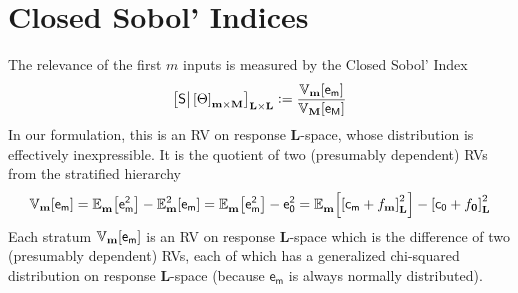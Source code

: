 \documentclass[preprint,12pt]{elsarticle}
\newcommand*{\M}[1]{\ensuremath{#1}\xspace}
\newcommand*{\x}{\times}
\newcommand*{\mi}[1]{\mathbf{#1}}
\newcommand*{\rv}[1]{\mathsf{#1}}
\newcommand*{\te}[2][]{\left\lbrack{#2}\right\rbrack_{#1}}
\newcommand*{\deq}{\M{\mathrel{\mathop:}=}}
\newcommand*{\ev}[3][]{\mathbb{E}_{#3}^{#1}\!\left\lbrack{#2}\right\rbrack}
\newcommand*{\cov}[3][]{\ifthenelse{\equal{#1}{}}{\mathbb{V}_{#3}\!\left\lbrack{#2}\right\rbrack}{\mathbb{V}_{#3}\!\left\lbrack{#2,#1}\right\rbrack}}
\begin{document}
    \section{Closed Sobol' Indices} \label{sec:Sobol}
        The relevance of the first $m$ inputs is measured by the Closed Sobol' Index
        \begin{equation} \label{def:Sobol:Sobol}
            \te[\mi{L}\x\mi{L}]{\rv{S} \big\vert \te[\mi{m}\x\mi{M}]{\Theta}} \deq 
            \frac
            {\cov{\rv{e_{m}}}{\mi{m}}}
            {\cov{\rv{e_{M}}}{\mi{M}}}
        \end{equation}
        In our formulation, this is an RV on response $\mi{L}$-space, whose distribution is effectively inexpressible. It is the quotient of two (presumably dependent) RVs from the stratified hierarchy
        \begin{equation*}
            \cov{\rv{e_{m}}}{\mi{m}} = \ev{\rv{e_{m}^{2}}}{\mi{m}} - \ev[2]{\rv{e_{m}}}{\mi{m}} = \ev{\rv{e_{m}^{2}}}{\mi{m}} - \rv{e_{0}^{2}} = \ev{\te[\mi{L}]{\rv{c_{m}} + f_{\mi{m}}}^{2}}{\mi{m}} - \te[\mi{L}]{\rv{c_{0}} + f_{\mi{0}}}^{2}
        \end{equation*}
        Each stratum $\cov{\rv{e_{m}}}{\mi{m}}$ is an RV on response $\mi{L}$-space which is the difference of two (presumably dependent) RVs, each of which has a generalized chi-squared distribution on response $\mi{L}$-space (because $\rv{e_m}$ is always normally distributed).
\end{document}
